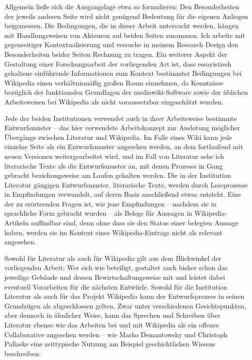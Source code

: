 \documentclass[fontsize=12pt]{scrartcl}
\begin{document}
Allgemein lie{\ss}e sich die Ausgangslage etwa so formulieren: Den Besonderheiten der jeweils anderen Seite wird nicht gen\"ugend Bedeutung f\"ur die eigenen Anliegen bei\-ge\-mes\-sen. Die Bedingungen, die in dieser Arbeit untersucht werden, h\"angen mit Handlungsweisen von Akteuren\textsuperscript{\tiny *} auf beiden Seiten zusammen. Ich arbeite mit gegenseitiger Kontextualisierung und versuche in meinem Research Design den Besonderheiten beider Seiten Rechnung zu tragen. Ein weiterer Aspekt der Gestaltung einer For\-schungsarbeit der vorliegenden Art ist, dass essayistisch gehaltene einf\"uhrende Informationen zum Kontext bestimmter Bedingungen bei Wi\-ki\-pe\-dia einen verh\"altnism\"a{\ss}ig gro{\ss}en Raum einnehmen, da Kenntnisse bez\"uglich der funktionalen Grundlagen der mediawiki-Software sowie der \"ublichen Arbeits\-weisen bei Wi\-ki\-pe\-dia als nicht voraussetzbar eingesch\"atzt wurden.
 
Jede der beiden Institutionen verwendet auch in ihrer Arbeits\-weise bestimmte Entwurfsmuster -- das \mbox{hier} verwendete Arbeits\-konzept zur Auslotung m\"og\-li\-cher \"Uber\-g\"an\-ge zwischen Li\-te\-ra\-tur\- und Wi\-ki\-pe\-dia. Im Falle eines Wiki kann jede einzelne Seite als ein Entwurfsmuster angesehen werden, an dem fortlaufend mit neuen Versionen weitergearbeitet wird, und im Fall von Li\-te\-ra\-tur sehe ich li\-te\-ra\-rische Texte als die Entwurfsmuster an, mit denen Prozesse in Gang gebracht beziehungsweise am Laufen gehalten werden. Die in der Institution Li\-te\-ra\-tur g\"angigen Entwurfsmuster, li\-te\-ra\-rische Texte, werden durch Leseprozesse in Emp\-fin\-dun\-gen verwandelt, auf deren Basis anschlie{\ss}end etwas entsteht. Eine der zu er\"orternden Fragen ist, wie jene Emp\-fin\-dun\-gen -- nachdem sie in sprachliche Form gebracht wurden -- als Belege f\"ur Aussagen in Wi\-ki\-pe\-dia-Artikeln auffindbar sind, denn ohne dass sie den Status einer belegten Aussage haben, werden sie im Kontext eines Wi\-ki\-pe\-dia-Eintrags nicht als relevant angesehen. 

Sowohl f\"ur Li\-te\-ra\-tur als auch f\"ur Wi\-ki\-pe\-dia gilt aus dem Blickwinkel der vorliegenden Arbeit: Wer sich wie beteiligt, gestaltet auch bis\-her schon das jeweilige Geb\"aude und dessen Bewirtschaftungsweise mit und leistet dabei eventuell Vorarbeiten f\"ur die n\"achsten Entw\"urfe. Sowohl f\"ur die Institution Li\-te\-ra\-tur als auch f\"ur das Projekt Wi\-ki\-pe\-dia kann der Entwurfsprozess in seinen Grundz\"ugen als abgeschlossen gelten. Zwar unter verschiedenen Gesichtspunkten, aber dennoch in \"ahnlicher Weise, kann das Sprechen und Schreiben \"uber Li\-te\-ra\-tur ebenso wie das Arbeiten bei und mit Wi\-ki\-pe\-dia als ein offenes Collaborative angesehen werden -- wie Marko Demantowsky und Christoph Pallaske eine zeittypische Nutzung am Bei\-spiel ge\-schicht\-li\-chen Wis\-sens beschreiben:
\end{document}
